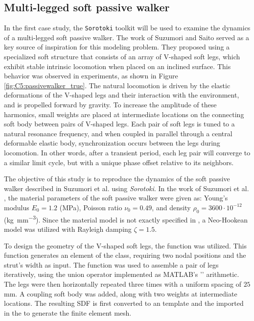 \subsection{Multi-legged soft passive walker}
\label{sec:C5:suzumori_walker}
In the first case study, the \texttt{Sorotoki} toolkit will be used to examine the dynamics of a multi-legged soft passive walker. The work of Suzumori and Saito \cite{Suzumori2008Sep} served as a key source of inspiration for this modeling problem. They proposed using a specialized soft structure that consists of an array of V-shaped soft legs, which exhibit stable intrinsic locomotion when placed on an inclined surface. This behavior was observed in experiments, as shown in Figure \ref{fig:C5:passivewalker_true}. The natural locomotion is driven by the elastic deformations of the V-shaped legs and their interaction with the environment, and is propelled forward by gravity. To increase the amplitude of these harmonics, small weights are placed at intermediate locations on the connecting soft body between pairs of V-shaped legs. Each pair of soft legs is tuned to a natural resonance frequency, and when coupled in parallel through a central deformable elastic body, synchronization occurs between the legs during locomotion. In other words, after a transient period, each leg pair will converge to a similar limit cycle, but with a unique phase offset relative to its neighbors.

The objective of this study is to reproduce the dynamics of the soft passive walker described in Suzumori et al. \cite{Suzumori2008Sep} using \textit{Sorotoki}. In the work of Suzumori et al. \cite{Suzumori2008Sep}, the material parameters of the soft passive walker were given as: Young's modulus $E_0 = 1.2$ (\si{\mega \pascal}), Poisson ratio $\nu_0 = 0.49$, and density $\rho_0 = 3600 \cdot 10^{-12}$ (\si{\kilo \gram \per \milli \metre \cubed}). Since the material model is not exactly specified in \cite{Suzumori2008Sep}, a Neo-Hookean model was utilized with Rayleigh damping $\zeta = 1.5$.

To design the geometry of the V-shaped soft legs, the  function was utilized. This function generates an element of the  class, requiring two nodal positions  and the strut's width  as input. The function was used to assemble a pair of legs iteratively, using the union operator implemented as {MATLAB}'s '\code{+}' arithmetic. The legs were then horizontally repeated three times with a uniform spacing of $25$ \si{\milli \metre}. A coupling soft body was added, along with two weights at intermediate locations. The resulting SDF is first converted to an  template and the imported in the  to generate the finite element mesh. %

